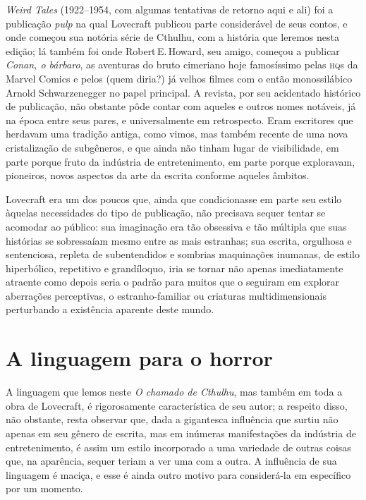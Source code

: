 \emph{Weird Tales} (1922--1954, com algumas tentativas de retorno aqui e
ali) foi a publicação \emph{pulp} na qual Lovecraft publicou parte
considerável de seus contos, e onde começou sua notória série de
Cthulhu, com a história que leremos nesta edição; lá também foi onde
Robert\,E.\,Howard, seu amigo, começou a publicar \emph{Conan, o bárbaro},
as aventuras do bruto cimeriano hoje famosíssimo pelas \textsc{hq}s da Marvel
Comics e pelos (quem diria?) já velhos filmes com o então monossilábico
Arnold Schwarzenegger no papel principal. A revista, por seu acidentado
histórico de publicação, não obstante pôde contar com aqueles e outros
nomes notáveis, já na época entre seus pares, e universalmente em
retrospecto. Eram escritores que herdavam uma tradição antiga, como
vimos, mas também recente de uma nova cristalização de subgêneros, e que
ainda não tinham lugar de visibilidade, em parte porque fruto da
indústria de entretenimento, em parte porque exploravam, pioneiros,
novos aspectos da arte da escrita conforme aqueles âmbitos.

Lovecraft era um dos poucos que, ainda que condicionasse em parte seu
estilo àquelas necessidades do tipo de publicação, não precisava
sequer tentar se acomodar ao público: sua imaginação era tão obsessiva e tão
múltipla que suas histórias se sobressaíam mesmo entre as mais
estranhas; sua escrita, orgulhosa e sentenciosa, repleta de
subentendidos e sombrias maquinações inumanas, de estilo hiperbólico,
repetitivo e grandíloquo, iria se tornar não apenas imediatamente
atraente como depois seria o padrão para muitos que o seguiram em
explorar aberrações perceptivas, o estranho-familiar ou criaturas
multidimensionais perturbando a existência aparente deste mundo.

\section{A linguagem para o horror}

A linguagem que lemos neste \emph{O chamado de Cthulhu}, mas também em toda
a obra de Lovecraft, é rigorosamente característica de seu autor; a
respeito disso, não obstante, resta observar que, dada a gigantesca
influência que surtiu não apenas em seu gênero de escrita, mas em
inúmeras manifestações da indústria de entretenimento, é assim um estilo
incorporado a uma variedade de outras coisas que, na aparência, sequer
teriam a ver uma com a outra. A influência de sua linguagem é maciça, e
esse é ainda outro motivo para considerá-la em específico por um
momento.

